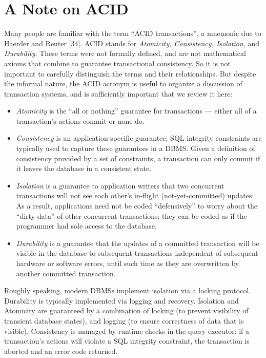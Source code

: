 \documentclass[a4paper,11pt,twoside,openright]{book}
\begin{document}
\hypertarget{a-note-on-acid}{%
\section{A Note on ACID}\label{a-note-on-acid}}

Many people are familiar with the term ``ACID transactions'', a mnemonic
due to Haerder and Reuter {[}34{]}. ACID stands for \emph{Atomicity,
Consistency, Isolation}, and \emph{Durability}. These terms were not
formally defined, and are not mathematical axioms that combine to
guarantee transactional consistency. So it is not important to
carefully distinguish the terms and their relationships. But despite
the informal nature, the ACID acronym is useful to organize a discussion
of transaction systems, and is sufficiently important that we review it
here:

\begin{itemize}
\item
  \emph{Atomicity} is the ``all or nothing'' guarantee for transactions
  --- either all of a transaction's actions commit or none do.
\item
  \emph{Consistency} is an application-specific guarantee; SQL integrity
  constraints are typically used to capture these guarantees in a DBMS.
  Given a definition of consistency provided by a set of constraints, a
  transaction can only commit if it leaves the database in a consistent
  state.
\item
  \emph{Isolation} is a guarantee to application writers that two
  concurrent transactions will not see each other's in-flight
  (not-yet-committed) updates. As a result, applications need not be
  coded ``defensively'' to worry about the ``dirty data'' of other
  concurrent transactions; they can be coded as if the programmer had
  sole access to the database.

\item
  \emph{Durability} is a guarantee that the updates of a committed
  transaction will be visible in the database to subsequent
  transactions independent of subsequent hardware or software errors,
  until such time as they are overwritten by another committed
  transaction.
\end{itemize}

Roughly speaking, modern DBMSs implement isolation via a locking
protocol. Durability is typically implemented via logging and recovery.
Isolation and Atomicity are guaranteed by a combination of locking (to
prevent visibility of transient database states), and logging (to ensure
correctness of data that is visible). Consistency is managed by runtime
checks in the query executor: if a transaction's actions will violate a
SQL integrity constraint, the transaction is aborted and an error code
returned.
\end{document}
